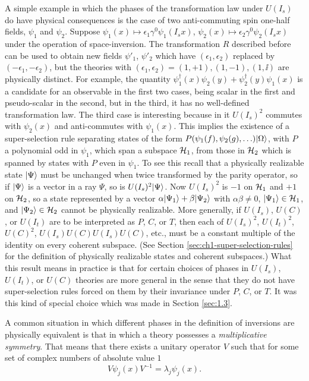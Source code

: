 A simple example in which the phases of the transformation law under
$U(I_s)$ do have physical consequences is the case of two anti-commuting spin
one-half fields, $\psi_1$ and $\psi_2$.  Suppose
$\psi_1(x)\mapsto\epsilon_1\gamma^0\psi_1(I_sx)$,
$\psi_2(x)\mapsto\epsilon_2\gamma^0\psi_2(I_sx)$ under the operation of
space-inversion.  The transformation $R$ described before can be used to
obtain new fields $\psi'_1$, $\psi'_2$ which have $(\epsilon_1,\epsilon_2)$
replaced by $(-\epsilon_1,-\epsilon_2)$, but the theories with
$(\epsilon_1,\epsilon_2)=(1,+1),(1,-1),(1,\ii)$ are physically distinct.
For example, the quantity
$\psi_1^\dagger(x)\psi_2(y)+\psi_2^\dagger(y)\psi_1(x)$ is a candidate for
an observable in the first two cases, being scalar in the first and
pseudo-scalar in the second, but in the third, it has no well-defined
transformation law.  The third case is interesting because in it
$U(I_s)^2$ commutes with $\psi_2(x)$ and anti-commutes with $\psi_1(x)$.  This
implies the existence of a super-selection rule separating states of the form
$P(\psi_1(f),\psi_2(g),\ldots)\lvert \Omega\rangle$, with $P$ a polynomial odd in
$\psi_1$, which span a subspace $\mathcal{H}_1$, from those in $\mathcal{H}_2$ which
is spanned by states with $P$ even in $\psi_1$.  To see this recall that a
physically realizable state $\lvert \Psi\rangle$ must be unchanged when twice
transformed by the parity operator, so if $\lvert \Psi\rangle$ is a vector in a ray
$\Psi$, so is $U(I_s)^2\lvert \Psi\rangle$.  Now $U(I_s)^2$ is $-1$ on $\mathcal{H}_1$
and $+1$ on $\mathcal{H}_2$, so a state represented by a vector
$\alpha\lvert \Psi_1\rangle+\beta\lvert \Psi_2\rangle$ with $\alpha\beta\ne0$,
$\lvert \Psi_1\rangle\in\mathcal{H}_1$, and $\lvert \Psi_2\rangle\in\mathcal{H}_2$ cannot be
physically realizable.  More generally, if $U(I_s)$, $U(C)$, or $U(I_t)$ are
to be interpreted as $P$, $C$, or $T$, then each of $U(I_s)^2$,
$U(I_t)^2$, $U(C)^2$, $U(I_s)U(C)U(I_s)U(C)$, etc., must be a constant
multiple of the identity on every coherent subspace.  (See Section \ref{sec:ch1-super-selection-rules} for
the definition of physically realizable states and coherent subspaces.)
What this result means in practice is that for certain choices of phases in
$U(I_s)$, $U(I_t)$, or $U(C)$ theories are more general in the sense that
they do not have super-selection rules forced on them by their invariance
under $P$, $C$, or $T$.  It was this kind of special choice which was made in
Section \ref{sec:1.3}.

A common situation in which different phases in the definition of inversions
are physically equivalent is that in which a theory possesses a
\emph{multiplicative symmetry}.  That means that there exists a unitary
operator $V$ such that for some set of complex numbers of absolute value $1$
\begin{equation}
  V\psi_j(x)V^{-1}=\lambda_j\psi_j(x).
  \tag{3-65}\label{eq:ch3-multiplicative-symmetry}
\end{equation}

